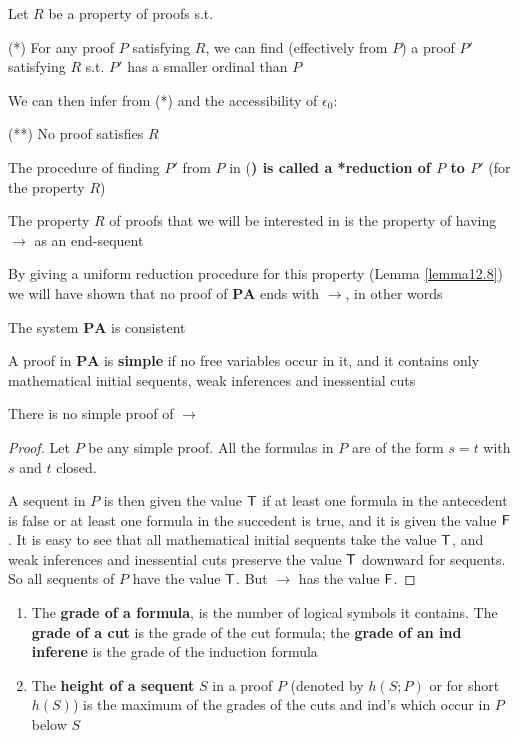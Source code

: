 \documentclass[11pt]{article}
\def \PA {\textbf{PA}}
\begin{document}
Let \(R\) be a property of proofs s.t.

(*) For any proof \(P\) satisfying \(R\), we can find (effectively from \(P\)) a proof \(P'\)
satisfying \(R\) s.t. \(P'\) has a smaller ordinal than \(P\)

We can then infer from (*) and the accessibility of \(\epsilon_0\):

(**) No proof satisfies \(R\)

The procedure of finding \(P'\) from \(P\) in (\textbf{) is called a *reduction of \(P\) to \(P'\)} (for
the property \(R\))

The property \(R\) of proofs that we will be interested in is the property of having \(\to\) as
an end-sequent

By giving a uniform reduction procedure for this property (Lemma \ref{lemma12.8}) we will have
shown that no proof of \(\PA\) ends with \(\to\), in other words

\begin{theorem}[]
\label{thm12.1}
The system \(\PA\) is consistent
\end{theorem}

\begin{definition}[]
A proof in \(\PA\) is \textbf{simple} if no free variables occur in it, and it contains only mathematical
initial sequents, weak inferences and inessential cuts
\end{definition}

\begin{lemma}[]
There is no simple proof of \(\to\)
\end{lemma}

\begin{proof}
Let \(P\)  be any simple proof. All the formulas in \(P\) are of the form \(s=t\) with \(s\)
and \(t\) closed.

A sequent in \(P\) is then given the value \(\textsf{T}\) if at least one formula in the antecedent is
false or at least one formula in the succedent is true, and it is given the value \(\textsf{F}\). It is
easy to see  that all mathematical initial sequents take the value \(\textsf{T}\), and weak inferences
and inessential cuts preserve the value \(\textsf{T}\) downward for sequents. So all sequents of \(P\)
have the value \(\textsf{T}\). But \(\to\) has the value \(\textsf{F}\).
\end{proof}

\begin{definition}[]
\begin{enumerate}
\item The \textbf{grade of a formula}, is the number of logical symbols it contains. The \textbf{grade of a cut} is
the grade of the cut formula; the \textbf{grade of an ind inferene} is the grade of the induction formula
\item The \textbf{height of a sequent} \(S\) in a proof \(P\) (denoted by \(h(S;P)\) or for short \(h(S)\))
is the maximum of the grades of the cuts and ind's which occur in \(P\) below \(S\)
\end{enumerate}
\end{definition}
\end{document}
